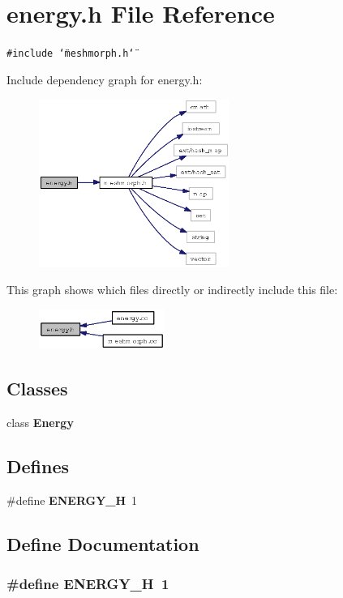 \section{energy.h File Reference}
\label{energy_8h}
{\tt \#include \char`\"{}meshmorph.h\char`\"{}}\par


Include dependency graph for energy.h:\begin{figure}[H]
\begin{center}
\leavevmode
\includegraphics[width=176pt]{energy_8h__incl}
\end{center}
\end{figure}


This graph shows which files directly or indirectly include this file:\begin{figure}[H]
\begin{center}
\leavevmode
\includegraphics[width=116pt]{energy_8h__dep__incl}
\end{center}
\end{figure}
\subsection*{Classes}
\begin{CompactItemize}
\item 
class {\bf Energy}
\end{CompactItemize}
\subsection*{Defines}
\begin{CompactItemize}
\item 
\#define {\bf ENERGY\_\-H}~1
\end{CompactItemize}


\subsection{Define Documentation}
\subsubsection{\setlength{\rightskip}{0pt plus 5cm}\#define ENERGY\_\-H~1}\label{energy_8h_aa0d043af0ffde6001be8c631764e0a7}


